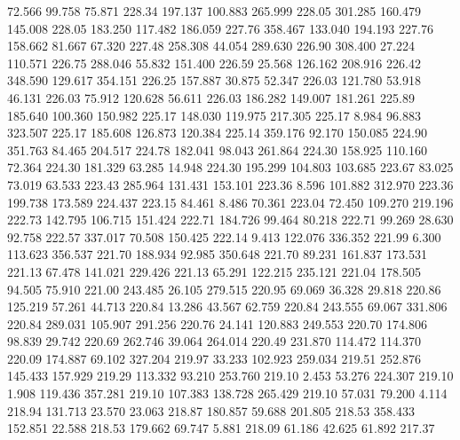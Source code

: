   72.566   99.758   75.871       228.34
 197.137  100.883  265.999       228.05
 301.285  160.479  145.008       228.05
 183.250  117.482  186.059       227.76
 358.467  133.040  194.193       227.76
 158.662   81.667   67.320       227.48
 258.308   44.054  289.630       226.90
 308.400   27.224  110.571       226.75
 288.046   55.832  151.400       226.59
  25.568  126.162  208.916       226.42
 348.590  129.617  354.151       226.25
 157.887   30.875   52.347       226.03
 121.780   53.918   46.131       226.03
  75.912  120.628   56.611       226.03
 186.282  149.007  181.261       225.89
 185.640  100.360  150.982       225.17
 148.030  119.975  217.305       225.17
   8.984   96.883  323.507       225.17
 185.608  126.873  120.384       225.14
 359.176   92.170  150.085       224.90
 351.763   84.465  204.517       224.78
 182.041   98.043  261.864       224.30
 158.925  110.160   72.364       224.30
 181.329   63.285   14.948       224.30
 195.299  104.803  103.685       223.67
  83.025   73.019   63.533       223.43
 285.964  131.431  153.101       223.36
   8.596  101.882  312.970       223.36
 199.738  173.589  224.437       223.15
  84.461    8.486   70.361       223.04
  72.450  109.270  219.196       222.73
 142.795  106.715  151.424       222.71
 184.726   99.464   80.218       222.71
  99.269   28.630   92.758       222.57
 337.017   70.508  150.425       222.14
   9.413  122.076  336.352       221.99
   6.300  113.623  356.537       221.70
 188.934   92.985  350.648       221.70
  89.231  161.837  173.531       221.13
  67.478  141.021  229.426       221.13
  65.291  122.215  235.121       221.04
 178.505   94.505   75.910       221.00
 243.485   26.105  279.515       220.95
  69.069   36.328   29.818       220.86
 125.219   57.261   44.713       220.84
  13.286   43.567   62.759       220.84
 243.555   69.067  331.806       220.84
 289.031  105.907  291.256       220.76
  24.141  120.883  249.553       220.70
 174.806   98.839   29.742       220.69
 262.746   39.064  264.014       220.49
 231.870  114.472  114.370       220.09
 174.887   69.102  327.204       219.97
  33.233  102.923  259.034       219.51
 252.876  145.433  157.929       219.29
 113.332   93.210  253.760       219.10
   2.453   53.276  224.307       219.10
   1.908  119.436  357.281       219.10
 107.383  138.728  265.429       219.10
  57.031   79.200    4.114       218.94
 131.713   23.570   23.063       218.87
 180.857   59.688  201.805       218.53
 358.433  152.851   22.588       218.53
 179.662   69.747    5.881       218.09
  61.186   42.625   61.892       217.37
